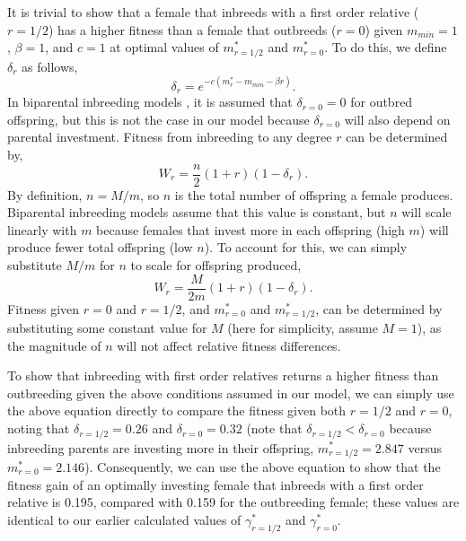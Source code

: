 \documentclass[12pt]{article}
\begin{document}
It is trivial to show that a female that inbreeds with a first order relative ($r=1/2$) has a higher fitness than a female that outbreeds ($r=0$) given $m_{min}=1$, $\beta=1$, and $c=1$ at optimal values of $m^{*}_{r=1/2}$ and $m^{*}_{r=0}$. To do this, we define $\delta_{r}$ as follows,
\begin{equation}
\delta_{r} = e^{-c(m^{*}_{r}-m_{min}-\beta r)}.
\end{equation}
In biparental inbreeding models \cite[e.g.,][]{Kokko2006, Parker2006, Duthie2015a}, it is assumed that $\delta_{r=0}=0$ for outbred offspring, but this is not the case in our model because $\delta_{r=0}$ will also depend on parental investment. Fitness from inbreeding to any degree $r$ can be determined by,
\begin{equation}
W_{r} = \frac{n}{2}\left(1+r\right)\left(1-\delta_{r}\right).
\end{equation}
By definition, $n = M/m$, so $n$ is the total number of offspring a female produces. Biparental inbreeding models assume that this value is constant, but $n$ will scale linearly with $m$ because females that invest more in each offspring (high $m$) will produce fewer total offspring (low $n$). To account for this, we can simply substitute $M/m$ for $n$ to scale for offspring produced,
\begin{equation}
W_{r} = \frac{M}{2 m}\left(1+r\right)\left(1-\delta_{r}\right).
\end{equation}
Fitness given $r=0$ and $r=1/2$, and $m^{*}_{r=0}$ and $m^{*}_{r=1/2}$, can be determined by substituting some constant value for $M$ (here for simplicity, assume $M=1$), as the magnitude of $n$ will not affect relative fitness differences. 

To show that inbreeding with first order relatives returns a higher fitness than outbreeding given the above conditions assumed in our model, we can simply use the above equation directly to compare the fitness given both $r=1/2$ and $r=0$, noting that $\delta_{r=1/2}=0.26$ and $\delta_{r=0}=0.32$ (note that $\delta_{r=1/2}<\delta_{r=0}$ because inbreeding parents are investing more in their offspring, $m^{*}_{r=1/2}=2.847$ versus $m^{*}_{r=0}=2.146$). Consequently, we can use the above equation to show that the fitness gain of an optimally investing female that inbreeds with a first order relative is 0.195, compared with 0.159 for the outbreeding female; these values are identical to our earlier calculated values of $\gamma^{*}_{r=1/2}$ and $\gamma^{*}_{r=0}$.
\end{document}
